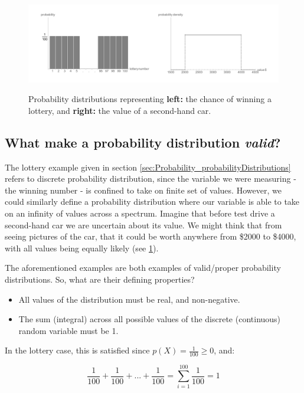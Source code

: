\documentclass[11pt,fullpage]{book}
\begin{document}
\begin{figure}
\centering
\scalebox{0.3} 
{\includegraphics{Probability_lotterySecondhandCarProbability.pdf}}
\caption{Probability distributions representing \textbf{left:} the chance of winning a lottery, and \textbf{right:} the value of a second-hand car.}\label{fig:Probability_lotterySecondhandCarProbability}
\end{figure}

\subsection{What make a probability distribution \textit{valid}?}\label{sec:Probability_validProbabilityDistribution}
The lottery example given in section \ref{sec:Probability_probabilityDistributions} refers to discrete probability distribution, since the variable we were measuring - the winning number - is confined to take on finite set of values. However, we could similarly define a probability distribution where our variable is able to take on an infinity of values across a spectrum. Imagine that before test drive a second-hand car we are uncertain about its value. We might think that from seeing pictures of the car, that it could be worth anywhere from \$2000 to \$4000, with all values being equally likely (see \ref{fig:Probability_lotterySecondhandCarProbability}).

The aforementioned examples are both examples of valid/proper probability distributions. So, what are their defining properties?

\begin{itemize}
\item All values of the distribution must be real, and non-negative.
\item The sum (integral) across all possible values of the discrete (continuous) random variable must be 1.
\end{itemize}

In the lottery case, this is satisfied since $p(X)=\frac{1}{100}\geq 0$, and:

\begin{equation}
\frac{1}{100} + \frac{1}{100} + ... + \frac{1}{100} = \sum\limits_{i=1}^{100} \frac{1}{100} = 1
\end{equation}
\end{document}

